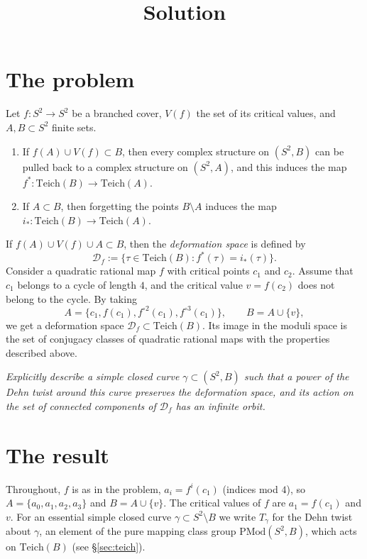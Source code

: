 \documentclass[11pt]{article}
\title{Solution}
\date{}
\author{}
\theoremstyle{definition}
\newcommand{\Teich}{\mathrm{Teich}}
\newcommand{\PMod}{\mathrm{PMod}}
\newcommand{\D}{\mathcal D}
\begin{document}
\maketitle

\section{The problem}

Let $f\colon S^2\to S^2$ be a branched cover, $V(f)$ the set of its critical values, and $A,B\subset S^2$ finite sets.
\begin{enumerate}
\item If $f(A)\cup V(f)\subset B$, then every complex structure on $(S^2,B)$ can be pulled back to a complex structure on $(S^2,A)$, and this induces the map $f^*\colon\Teich(B)\to\Teich(A)$.
\item If $A\subset B$, then forgetting the points $B\setminus A$ induces the map $i_*\colon\Teich(B)\to\Teich(A)$.
\end{enumerate}
If $f(A)\cup V(f)\cup A\subset B$, then the \emph{deformation space} is defined by
\[\D_f:=\{\tau\in\Teich(B): f^*(\tau)=i_*(\tau)\}.\]
Consider a quadratic rational map $f$ with critical points $c_1$ and $c_2$. Assume that $c_1$ belongs to a cycle of length $4$, and the critical value $v=f(c_2)$ does not belong to the cycle. By taking
\[A=\{c_1,f(c_1),f^{\circ2}(c_1),f^{\circ3}(c_1)\},\qquad B=A\cup\{v\},\]
we get a deformation space $\D_f\subset\Teich(B)$. Its image in the moduli space is the set of conjugacy classes of quadratic rational maps with the properties described above.

\emph{Explicitly describe a simple closed curve $\gamma\subset(S^2,B)$ such that a power of the Dehn twist around this curve preserves the deformation space, and its action on the set of connected components of $\D_f$ has an infinite orbit.}

\section{The result}

Throughout, $f$ is as in the problem, $a_i=f^{i}(c_1)$ (indices mod $4$), so $A=\{a_0,a_1,a_2,a_3\}$ and $B=A\cup\{v\}$. The critical values of $f$ are $a_1=f(c_1)$ and $v$. For an essential simple closed curve $\gamma\subset S^2\setminus B$ we write $T_\gamma$ for the Dehn twist about $\gamma$, an element of the pure mapping class group $\PMod(S^2,B)$, which acts on $\Teich(B)$ (see \S\ref{sec:teich}).
\end{document}
